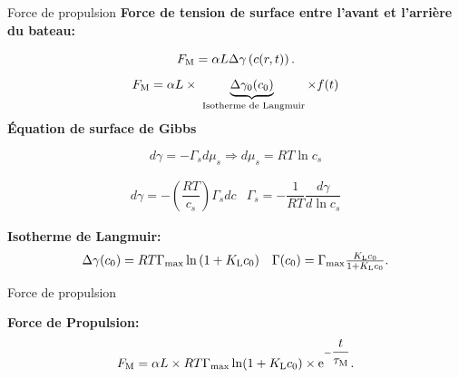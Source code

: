 \documentclass[aspectratio=169,10pt]{beamer}
\begin{document}
\begin{frame}{Force de propulsion}
  \textbf{Force de tension de surface entre l'avant et l'arrière du bateau:}
     
      \begin{equation}
        F_{\rm M} = \alpha L\Delta\gamma\left(c(r,t)\right).\nonumber 
      \end{equation}
      \begin{equation}
         F_{\rm M} = \alpha L \times \underbrace{\Delta\gamma_0(c_0)}_{\text{ Isotherme de Langmuir}}\times f(t)
    \end{equation}
    \textbf{Équation de surface de Gibbs}

    \begin{equation}
      d\gamma=-\Gamma_sd\mu_s\Rightarrow    d\mu_s=RT\ln c_s
    \end{equation}

    \begin{equation}
      \begin{array}{cc}
        d\gamma=-\left(\dfrac{RT}{c_s}\right)\Gamma_sd c & \Gamma_s=-\dfrac{1}{RT}\dfrac{d\gamma}{d\ln c_s}
      \end{array}
    \end{equation}


    \textbf{Isotherme de Langmuir:}
    \begin{equation}
      \begin{array}{cc}
        \Delta\gamma(c_0) = RT\Gamma_{\rm max}\ln{\left(1+K_{\rm L}c_0\right)} & \Gamma(c_0) = \Gamma_{\rm max}\frac{K_{\rm L}c_0}{1+K_{\rm L}c_0}.
      \end{array}
    \end{equation}
  


\end{frame}

\begin{frame}{Force de propulsion}

  \begin{ombredef}
    \begin{defi}
      \textbf{Force de Propulsion:}  
      \begin{equation}
        F_{\rm M} =\alpha L\times RT\Gamma_{\rm max}\ln(1+K_{\rm L}c_0)\times {\rm e}^{-\dfrac{t}{\tau_{\rm M}}}.
    \end{equation}
  \end{defi}
  \end{ombredef}

\end{frame}
\end{document}
